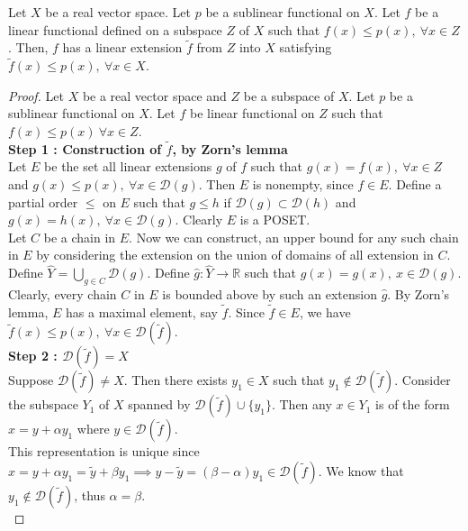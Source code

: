 \begin{theorem}
	Let $X$ be a real vector space.
	Let $p$ be a sublinear functional on $X$.
	Let $f$ be a linear functional defined on a subspace $Z$ of $X$ such that $f(x) \le p(x),\ \forall x \in Z$.
	Then, $f$ has a linear extension $\tilde{f}$ from $Z$ into $X$ satisfying $\tilde{f}(x) \le p(x),\ \forall x \in X$.
\end{theorem}
\begin{proof}
	Let $X$ be a real vector space and $Z$ be a subspace of $X$.
	Let $p$ be a sublinear functional on $X$.
	Let $f$ be linear functional on $Z$ such that $f(x) \le p(x)\ \forall x \in Z$.\\

	\textbf{Step 1 : Construction of $\tilde{f}$, by Zorn's lemma}\\
	Let $E$ be the set all linear extensions $g$ of $f$ such that $g(x) = f(x),\ \forall x \in Z$ and $g(x) \le p(x),\ \forall x \in \mathscr{D}(g)$.
	Then $E$ is nonempty, since $f \in E$.
	Define a partial order $\le$ on $E$ such that $g \le h$ if $\mathscr{D}(g) \subset \mathscr{D}(h)$ and $g(x) = h(x),\ \forall x \in \mathscr{D}(g)$.
	Clearly $E$ is a POSET.\\

	Let $C$ be a chain in $E$.
	Now we can construct, an upper bound for any such chain in $E$ by considering the extension on the union of domains of all extension in $C$.
	Define $\displaystyle \hat{Y} = \bigcup_{g \in C} \mathscr{D}(g)$.
	Define $\hat{g} : \hat{Y} \to \mathbb{R}$ such that $\hat{g}(x) = g(x),\ x \in \mathscr{D}(g)$.
	Clearly, every chain $C$ in $E$ is bounded above by such an extension $\hat{g}$.
	By Zorn's lemma, $E$ has a maximal element, say $\tilde{f}$.
	{\color{red}Since $\tilde{f} \in E$, we have $\tilde{f}(x) \le p(x),\ \forall x \in \mathscr{D}(\tilde{f})$.}\\

	\textbf{Step 2 : $\mathscr{D}(\tilde{f}) = X$}\\
	Suppose $\mathscr{D}(\tilde{f}) \ne X$.
	Then there exists $y_1 \in X$ such that $y_1 \notin \mathscr{D}(\tilde{f})$.
	Consider the subspace $Y_1$ of $X$ spanned by $\mathscr{D}(\tilde{f}) \cup \{ y_1 \}$.
	Then any $x \in Y_1$ is of the form $x = y + \alpha y_1$ where $y \in \mathscr{D}(\tilde{f})$.\\

	This representation is unique since $x = y + \alpha y_1 = \tilde{y} + \beta y_1 \implies y-\tilde{y} = (\beta-\alpha)y_1 \in \mathscr{D}(\tilde{f})$.
	We know that $y_1 \notin \mathscr{D}(\tilde{f})$, thus $\alpha = \beta$.\\


\end{proof}
